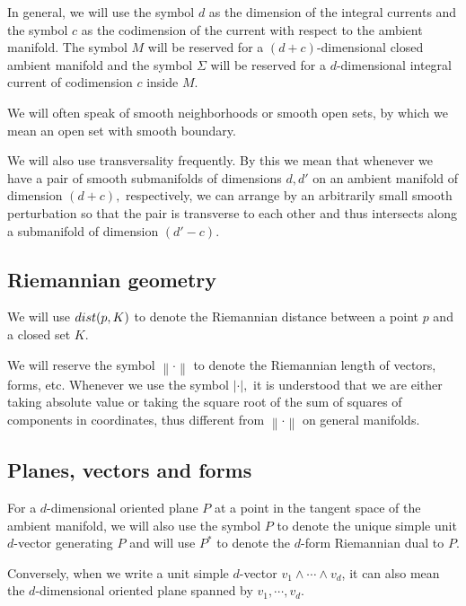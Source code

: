 \documentclass[11pt,a4paper]{amsart}
\numberwithin{equation}{section}
\newcommand{\Si}{\Sigma}
\newcommand{\cd}{\cdots}
\newcommand{\no}[1]{\left\lVert#1\right\rVert}
\newcommand{\w}{\wedge}
\theoremstyle{plain}
\theoremstyle{definition}
\numberwithin{equation}{subsection}
\begin{document}
	In general, we will use the symbol $d$ as the dimension of the integral currents and the symbol $c$ as the codimension of the current with respect to the ambient manifold. The symbol $M$ will be reserved for a $(d+c)$-dimensional closed ambient manifold and the symbol $\Si$ will be reserved for a $d$-dimensional integral current of codimension $c$ inside $M.$ %
	
	We will often speak of smooth neighborhoods or smooth open sets, by which we mean an open set with smooth boundary.%
	
		We will also use transversality \cite{MH} frequently. By this we mean that whenever we have a  pair of smooth submanifolds of dimensions $d,d'$ on an ambient manifold of dimension $(d+c),$ respectively, we can arrange by an arbitrarily small smooth perturbation so that the pair is transverse to each other and thus intersects along a submanifold of dimension $(d'-c)$.	
	\subsection{Riemannian geometry}\label{basrie}
We will use $\textnormal{dist}(p,K)$ to denote the Riemannian distance between a point $p$ and a closed set $K.$ 
	
	We will reserve the symbol $\no{\cdot}$ to denote the Riemannian length of vectors, forms, etc. Whenever we use the symbol $|\cdot|,$ it is understood that we are either taking absolute value or taking the square root of the sum of squares of components in coordinates, thus different from $\no{\cdot}$ on general manifolds.
\subsection{Planes, vectors and forms}
For a $d$-dimensional oriented plane $P$ at a point in the tangent space of the ambient manifold, we will also use the symbol $P$ to denote the unique simple unit $d$-vector generating $P$ and will use $P^\ast$ to denote the $d$-form Riemannian dual to $P.$ 

Conversely, when we write a unit simple $d$-vector $v_1\w\cd\w v_d$, it can also mean the $d$-dimensional oriented plane spanned by $v_1,\cd,v_d.$
\end{document}
